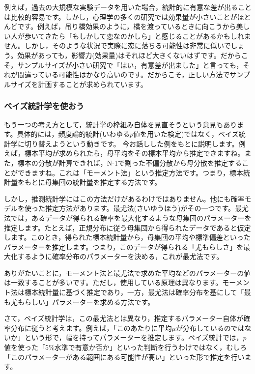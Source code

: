 \documentclass{ltjsbook}
\begin{document}
例えば，過去の大規模な実験データを用いた場合，統計的に有意な差が出ることは比較的容易です。しかし，心理学の多くの研究では効果量が小さいことがほとんどです。例えば，吊り橋効果のように，橋を渡っているときに向こうから美しい人が歩いてきたら「もしかして恋なのかしら」と感じることがあるかもしれません。しかし，そのような状況で実際に恋に落ちる可能性は非常に低いでしょう。効果があっても，影響力(効果量)はそれほど大きくないはずです。だからこそ，サンプルサイズが小さい研究で「はい，有意差が出ました」と言っても，それが間違っている可能性はかなり高いのです。だからこそ，正しい方法でサンプルサイズを計画することが求められています。

\subsubsection{ベイズ統計学を使おう}
もう一つの考え方として，統計学の枠組み自体を見直そうという意見もあります。具体的には，頻度論的統計(いわゆる$p$値を用いた検定)ではなく，ベイズ統計学に切り替えようという動きです。
今お話しした例をもとに説明します。例えば，標本平均が求められたら，母平均をその標本平均から推定できますね。また，標本の分散が計算できれば，N-1で割った不偏分散から母分散を推定することができますね。これは「モーメント法」という推定方法です。つまり，標本統計量をもとに母集団の統計量を推定する方法です。

しかし，推測統計学にはこの方法だけがあるわけではありません。他にも確率モデルを使った推定方法があります。最尤法(さいゆうほう)がその一つです。最尤法では，あるデータが得られる確率を最大化するような母集団のパラメーターを推定します。たとえば，正規分布に従う母集団から得られたデータであると仮定します。このとき，得られた標本統計量から，母集団の平均や標準偏差といったパラメーターを推定します。つまり，このデータが得られる「尤もらしさ」を最大化するように確率分布のパラメーターを決める，これが最尤法です。

ありがたいことに，モーメント法と最尤法で求めた平均などのパラメーターの値は一致することが多いです。ただし，使用している原理は異なります。モーメント法は標本統計量に基づく推定であり，一方，最尤法は確率分布を基にして「最も尤もらしい」パラメーターを求める方法です。

さて，ベイズ統計学は，この最尤法とは異なり，推定するパラメーター自体が確率分布に従うと考えます。例えば，「このあたりに平均$\mu$が分布しているのではないか」という形で，幅を持ってパラメーターを推定します。ベイズ統計では，$p$値を使った「5\%水準で有意か否か」といった判断を行うわけではなく，むしろ「このパラメーターがある範囲にある可能性が高い」といった形で推定を行います。
\end{document}
